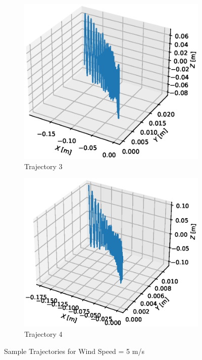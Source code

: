 \begin{figure}[H]
\begin{subfigure}{.5\textwidth}
\end{subfigure}
\hfill
\begin{subfigure}{.5\textwidth}
\centering
\includegraphics[width=\linewidth]{Images/trajectory_sin copy 2.eps}
\caption{Trajectory 3}
\end{subfigure}
\begin{subfigure}{.5\textwidth}
\centering

\includegraphics[width=\linewidth]{Images/trajectory_sin copy 3.eps}
\caption{Trajectory 4}
\end{subfigure}
\caption{Sample Trajectories for Wind Speed = 5 m/s}
\label{fig: trajSin}
\end{figure}

